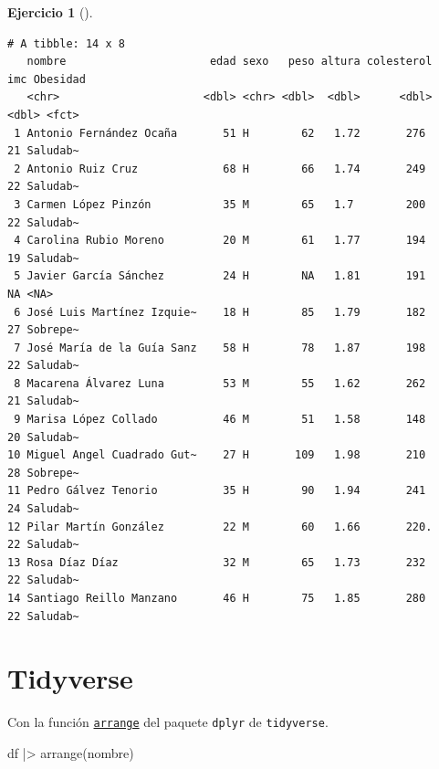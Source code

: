 \documentclass[
  a4paper,
]{scrreport}
\newenvironment{Shaded}{\begin{snugshade}}{\end{snugshade}}
\newcommand{\FunctionTok}[1]{\textcolor[rgb]{0.28,0.35,0.67}{#1}}
\newcommand{\NormalTok}[1]{\textcolor[rgb]{0.00,0.23,0.31}{#1}}
\newcommand{\SpecialCharTok}[1]{\textcolor[rgb]{0.37,0.37,0.37}{#1}}
\theoremstyle{definition}
\newtheorem{exercise}{Ejercicio}[chapter]
\theoremstyle{remark}
\begin{document}
\begin{exercise}[]
\begin{enumerate}
\begin{tcolorbox}
\begin{Shaded}
\end{Shaded}

\begin{verbatim}
# A tibble: 14 x 8
   nombre                      edad sexo   peso altura colesterol   imc Obesidad
   <chr>                      <dbl> <chr> <dbl>  <dbl>      <dbl> <dbl> <fct>   
 1 Antonio Fernández Ocaña       51 H        62   1.72       276     21 Saludab~
 2 Antonio Ruiz Cruz             68 H        66   1.74       249     22 Saludab~
 3 Carmen López Pinzón           35 M        65   1.7        200     22 Saludab~
 4 Carolina Rubio Moreno         20 M        61   1.77       194     19 Saludab~
 5 Javier García Sánchez         24 H        NA   1.81       191     NA <NA>    
 6 José Luis Martínez Izquie~    18 H        85   1.79       182     27 Sobrepe~
 7 José María de la Guía Sanz    58 H        78   1.87       198     22 Saludab~
 8 Macarena Álvarez Luna         53 M        55   1.62       262     21 Saludab~
 9 Marisa López Collado          46 M        51   1.58       148     20 Saludab~
10 Miguel Angel Cuadrado Gut~    27 H       109   1.98       210     28 Sobrepe~
11 Pedro Gálvez Tenorio          35 H        90   1.94       241     24 Saludab~
12 Pilar Martín González         22 M        60   1.66       220.    22 Saludab~
13 Rosa Díaz Díaz                32 M        65   1.73       232     22 Saludab~
14 Santiago Reillo Manzano       46 H        75   1.85       280     22 Saludab~
\end{verbatim}

  \section{Tidyverse}

  Con la función
  \href{https://dplyr.tidyverse.org/reference/arrange.html}{\texttt{arrange}}
  del paquete \texttt{dplyr} de \texttt{tidyverse}.

\begin{Shaded}
\begin{Highlighting}[]
\NormalTok{df }\SpecialCharTok{|\textgreater{}} \FunctionTok{arrange}\NormalTok{(nombre)}
\end{Highlighting}
\end{Shaded}


\end{tcolorbox}
\end{enumerate}
\end{exercise}
\end{document}

